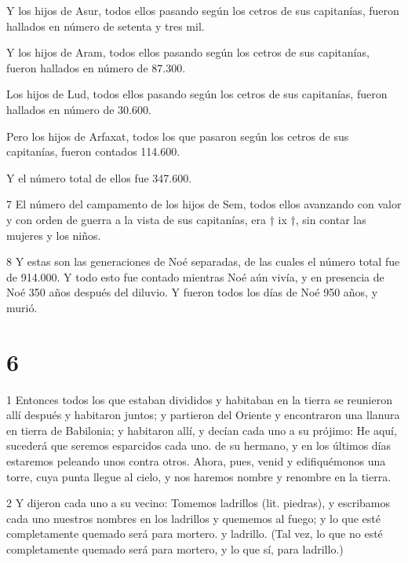 Y los hijos de Asur, todos ellos pasando según los cetros de sus capitanías, fueron hallados en número de setenta y tres mil.

Y los hijos de Aram, todos ellos pasando según los cetros de sus capitanías, fueron hallados en número de 87.300.

Los hijos de Lud, todos ellos pasando según los cetros de sus capitanías, fueron hallados en número de 30.600.

\par [El número de los hijos de Cham era setenta y tres mil.]

Pero los hijos de Arfaxat, todos los que pasaron según los cetros de sus capitanías, fueron contados 114.600.

\par Y el número total de ellos fue 347.600.

\par 7 El número del campamento de los hijos de Sem, todos ellos avanzando con valor y con orden de guerra a la vista de sus capitanías, era † ix †, sin contar las mujeres y los niños.

\par 8 Y estas son las generaciones de Noé separadas, de las cuales el número total fue de 914.000. Y todo esto fue contado mientras Noé aún vivía, y en presencia de Noé 350 años después del diluvio. Y fueron todos los días de Noé 950 años, y murió.

\chapter{6}

\par 1 Entonces todos los que estaban divididos y habitaban en la tierra se reunieron allí después y habitaron juntos; y partieron del Oriente y encontraron una llanura en tierra de Babilonia; y habitaron allí, y decían cada uno a su prójimo: He aquí, sucederá que seremos esparcidos cada uno. de su hermano, y en los últimos días estaremos peleando unos contra otros. Ahora, pues, venid y edifiquémonos una torre, cuya punta llegue al cielo, y nos haremos nombre y renombre en la tierra.

\par 2 Y dijeron cada uno a su vecino: Tomemos ladrillos (lit. piedras), y escribamos cada uno nuestros nombres en los ladrillos y quememos al fuego; y lo que esté completamente quemado será para mortero. y ladrillo. (Tal vez, lo que no esté completamente quemado será para mortero, y lo que sí, para ladrillo.)

